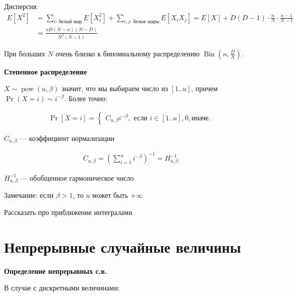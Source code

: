 \documentclass[12pt]{article}
\DeclareMathOperator{\Bin}{Bin}
\DeclareMathOperator{\pow}{pow}
\begin{document}
  Дисперсия: 
  \begin{align*}
    E[X^2] &= \sum_{i \text{- белый шар}} E[X_i^2] + \sum_{i, j \text{- белые шары}} E[X_i X_j] = E[X] + D(D - 1) \cdot \frac{n}{N} \cdot \frac{n - 1}{N - 1} \\
           &= \frac{nD(N - n)(N - D)}{N^2(N - 1)}
  \end{align*} 

  При больших $N$ очень близко к биномиальному распределению $\Bin(n, \frac{D}{N})$.

  \textbf{Степенное распределение}

  $X \sim \pow(u, \beta)$ значит, что мы выбираем число из $[1..u]$, причем $\Pr(X = i) \sim i^{-\beta}$. Более точно:

  \begin{align*}
      \Pr[X = i] = \begin{cases}
          C_{u, \beta} i^{-\beta}, \text{ если } i \in [1..u],
          0, \text{иначе.}
      \end{cases}
  \end{align*}

  $C_{u, \beta}$ --- коэффициент нормализации

  \begin{align*}
      C_{u, \beta} = \left(\sum_{i = 1}^u i^{-\beta}\right)^{-1} = H_{u,\beta}^{-1}
  \end{align*}

  $H_{u,\beta}^{-1}$ --- обобщенное гармоническое число

  Замечание: если $\beta > 1$, то $u$ может быть $+\infty$

  Рассказать про приближение интегралами


  \section{Непрерывные случайные величины}

  \textbf{Определение непрерывных с.в.}

  В случае с дискретными величинами:

  \begin{center}
  \end{center}
\end{document}

